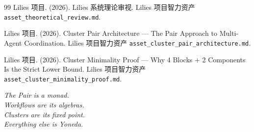 \documentclass[11pt,a4paper]{article}
\theoremstyle{definition}
\theoremstyle{definition}
\theoremstyle{remark}
\begin{document}
\begin{thebibliography}{99}
Lilies 项目. (2026).
Lilies 系统理论审视.
Lilies 项目智力资产 \texttt{asset\_theoretical\_review.md}.

Lilies 项目. (2026).
Cluster Pair Architecture — The Pair Approach to Multi-Agent Coordination.
Lilies 项目智力资产 \texttt{asset\_cluster\_pair\_architecture.md}.

Lilies 项目. (2026).
Cluster Minimality Proof — Why 4 Blocks + 2 Components Is the Strict Lower Bound.
Lilies 项目智力资产 \texttt{asset\_cluster\_minimality\_proof.md}.

\end{thebibliography}

\vspace{1cm}
\begin{center}
\large
\textit{The Pair is a monad. \\
Workflows are its algebras. \\
Clusters are its fixed point. \\
Everything else is Yoneda.}
\end{center}
\end{document}
